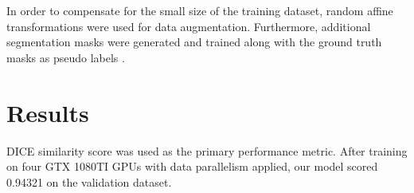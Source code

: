 \documentclass[letterpaper]{article}
\begin{document}
In order to compensate for the small size of the training dataset, random affine transformations were used for data augmentation. Furthermore, additional segmentation masks were generated and trained along with the ground truth masks as pseudo labels \cite{pseudo}.

\section{Results}

DICE similarity score was used as the primary performance metric. After training on four GTX 1080TI GPUs with data parallelism applied, our model scored 0.94321 on the validation dataset.



\end{document}
